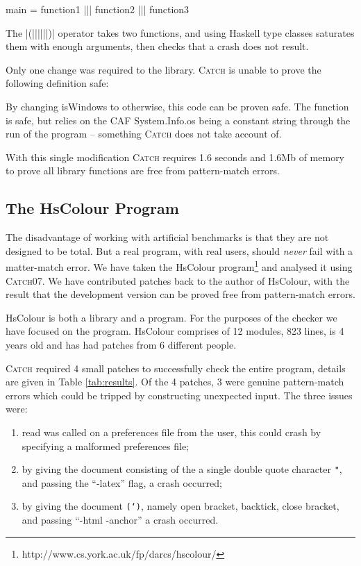 \documentclass[preprint]{sigplanconf}
\newcommand{\T}[1]{\texttt{#1}}
\newcommand{\C}[1]{\textsf{#1}}
\newcommand{\catch}{\textsc{Catch}}
\begin{document}
\begin{code}
main = function1 ||| function2 ||| function3
\end{code}

The |(||||||)| operator takes two functions, and using Haskell type classes saturates them with enough arguments, then checks that a crash does not result.

Only one change was required to the library. \catch{} is unable to prove the following definition safe:


By changing \C{isWindows} to \C{otherwise}, this code can be proven safe. The function is safe, but relies on the CAF \C{System.Info.os} being a constant string through the run of the program -- something \catch{} does not take account of.

With this single modification \catch{} requires 1.6 seconds and 1.6Mb of memory to prove all library functions are free from pattern-match errors.

\subsection{The HsColour Program}
\label{sec:hscolour}

The disadvantage of working with artificial benchmarks is that they are not designed to be total. But a real program, with real users, should \textit{never} fail with a matter-match error. We have taken the HsColour program\footnote{http://www.cs.york.ac.uk/fp/darcs/hscolour/} and analysed it using \catch07. We have contributed patches back to the author of HsColour, with the result that the development version can be proved free from pattern-match errors.

HsColour is both a library and a program. For the purposes of the checker we have focused on the program. HsColour comprises of 12 modules, 823 lines, is 4 years old and has had patches from 6 different people.

\catch{} required 4 small patches to successfully check the entire program, details are given in Table \ref{tab:results}. Of the 4 patches, 3 were genuine pattern-match errors which could be tripped by constructing unexpected input. The three issues were:

\begin{enumerate}
\item \C{read} was called on a preferences file from the user, this could crash by specifying a malformed preferences file;
\item by giving the document consisting of the a single double quote character \T{"}, and passing the ``-latex'' flag, a crash occurred;
\item by giving the document \T{(`)}, namely open bracket, backtick, close bracket, and passing ``-html -anchor'' a crash occurred.
\end{enumerate}
\end{document}
